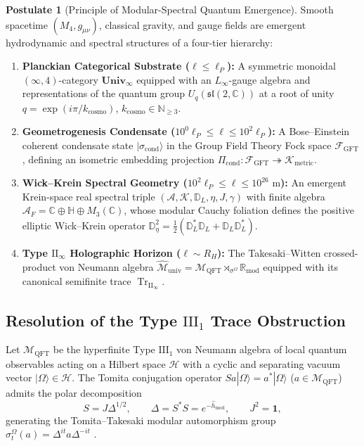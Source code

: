 \documentclass[11pt,a4paper]{article}
\theoremstyle{plain}
\theoremstyle{definition}
\newtheorem{postulate}[theorem]{Postulate}
\theoremstyle{remark}
\newcommand{\TrII}{\operatorname{Tr}_{\mathrm{II}_\infty}}
\newcommand{\M}{\mathcal{M}}
\newcommand{\K}{\mathcal{K}}
\newcommand{\Hilb}{\mathcal{H}}
\newcommand{\A}{\mathcal{A}}
\newcommand{\F}{\mathcal{F}}
\newcommand{\C}{\mathbb{C}}
\newcommand{\R}{\mathbb{R}}
\newcommand{\N}{\mathbb{N}}
\newcommand{\Quat}{\mathbb{H}}
\newcommand{\Dbb}{\mathbb{D}}
\begin{document}
\begin{postulate}[Principle of Modular-Spectral Quantum Emergence]
\label{post:main}
Smooth spacetime $(M_4, g_{\mu\nu})$, classical gravity, and gauge fields are emergent hydrodynamic and spectral structures of a four-tier hierarchy:
\begin{enumerate}[label=\textbf{Tier \arabic*:}]
  \item \textbf{Planckian Categorical Substrate ($\ell \le \ell_P$):} A symmetric monoidal $(\infty,4)$-category $\mathbf{Univ}_\infty$ equipped with an $L_\infty$-gauge algebra and representations of the quantum group $U_q(\mathfrak{sl}(2,\C))$ at a root of unity $q = \exp(i\pi / k_{\mathrm{cosmo}})$, $k_{\mathrm{cosmo}} \in \N_{\ge 3}$.
  \item \textbf{Geometrogenesis Condensate ($10^0 \ell_P \le \ell \le 10^2 \ell_P$):} A Bose--Einstein coherent condensate state $|\sigma_{\mathrm{cond}}\rangle$ in the Group Field Theory Fock space $\F_{\mathrm{GFT}}$, defining an isometric embedding projection $\Pi_{\mathrm{cond}}: \F_{\mathrm{GFT}} \twoheadrightarrow \K_{\mathrm{metric}}$.
  \item \textbf{Wick--Krein Spectral Geometry ($10^2 \ell_P \le \ell \le 10^{26}\text{ m}$):} An emergent Krein-space real spectral triple $(\A, \K, \Dbb_L, \eta, J, \gamma)$ with finite algebra $\A_F = \C \oplus \Quat \oplus M_3(\C)$, whose modular Cauchy foliation defines the positive elliptic Wick--Krein operator $\Dbb_\eta^2 = \frac{1}{2}(\Dbb_L^*\Dbb_L + \Dbb_L\Dbb_L^*)$.
  \item \textbf{Type $\mathrm{II}_\infty$ Holographic Horizon ($\ell \sim R_H$):} The Takesaki--Witten crossed-product von Neumann algebra $\widehat{\M}_{\mathrm{univ}} = \M_{\mathrm{QFT}} \rtimes_{\sigma^\Omega} \R_{\mathrm{mod}}$ equipped with its canonical semifinite trace $\TrII$.
\end{enumerate}
\end{postulate}

\subsection{Resolution of the Type $\mathrm{III}_1$ Trace Obstruction}

Let $\M_{\mathrm{QFT}}$ be the hyperfinite Type $\mathrm{III}_1$ von Neumann algebra of local quantum observables acting on a Hilbert space $\Hilb$ with a cyclic and separating vacuum vector $|\Omega\rangle \in \Hilb$. The Tomita conjugation operator $S a |\Omega\rangle = a^* |\Omega\rangle$ ($a \in \M_{\mathrm{QFT}}$) admits the polar decomposition
\begin{equation}
  S = J \Delta^{1/2}, \qquad \Delta = S^* S = e^{-\hat{h}_{\mathrm{mod}}}, \qquad J^2 = \mathbf{1},
\end{equation}
generating the Tomita--Takesaki modular automorphism group $\sigma_t^\Omega(a) = \Delta^{it} a \Delta^{-it}$ \cite{Takesaki2003,ConnesRovelli1994}.
\end{document}
